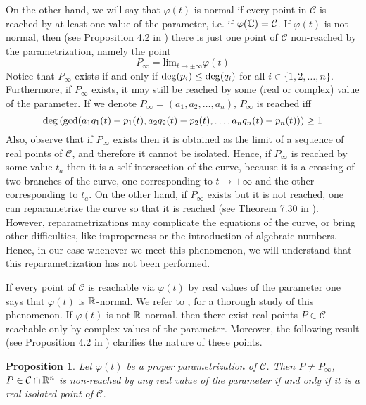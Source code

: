 \documentclass{elsart}
\def\deg{{\rm deg}}
\newtheorem{proposition}[theorem]{{\bf Proposition}}
\begin{document}
On the other hand, we will say that $\varphi(t)$ is {\sf normal} if
every point in ${\mathcal C}$ is reached by at least one value of
the parameter, i.e. if
$\varphi({\Bbb C})={\mathcal C}$. If $\varphi(t)$ is
not normal, then (see Proposition 4.2 in \cite{Andradas})
there is just one point of ${\mathcal C}$ non-reached by the parametrization,
namely the point \[P_{\infty}=\mbox{lim}_{t\to \pm \infty}\varphi(t)\]Notice that $P_{\infty}$ exists
if and only if
$\deg(p_i)\leq \deg(q_i)$ for all $i\in \{1,2,\ldots,n\}$. Furthermore, if $P_{\infty}$ exists,
it may still be reached by some (real or complex) value of the parameter. If we denote
$P_{\infty}=(a_1,a_2,\ldots,a_n)$, $P_{\infty}$ is reached iff \[\deg\left(\gcd(a_1q_1(t)-p_1(t),a_2q_2(t)-p_2(t),\ldots,a_nq_n(t)-p_n(t))\right)\geq 1\]
Also, observe that if $P_{\infty}$ exists then it is obtained as the limit of a
sequence of real points of ${\mathcal C}$, and therefore it cannot be isolated.
 Hence, if $P_{\infty}$ is reached by some value $t_a$ then it is a self-intersection
 of the curve, because it is a crossing of two branches of the curve, one corresponding to $t\to \pm\infty$ and the
 other corresponding to $t_a$. On the other hand,
 if $P_{\infty}$ exists but it is not reached, one can
 reparametrize the curve so that it is reached (see Theorem 7.30
 in \cite{SWPD}). However, reparametrizations may complicate the
 equations of the curve, or bring other difficulties, like
 improperness or the introduction of algebraic numbers. Hence, in our case whenever we meet this
 phenomenon, we will understand that this reparametrization has
 not been performed.

If every point of ${\mathcal C}$ is reachable via $\varphi(t)$ by real values of the parameter
 one says that $\varphi(t)$ is ${\Bbb R}$-{\sf normal}. We refer to \cite{Andradas}, \cite{SWPD} for a
 thorough study of this phenomenon. If $\varphi(t)$ is not ${\Bbb R}$-{\sf normal}, then there exist real
 points $P\in {\mathcal C}$ reachable only by complex values of the parameter. Moreover, the following
 result (see  Proposition 4.2 in \cite{Andradas}) clarifies the nature of these points.

\begin{proposition}\label{R-normal}
Let $\varphi(t)$ be a proper parametrization of ${\mathcal C}$.
Then $P\neq P_{\infty}$, $P\in {\mathcal C}\cap {\Bbb R}^n$ is non-reached by any real value of the
parameter if and only if it
is a real isolated point of ${\mathcal C}$.
\end{proposition}
\end{document}
